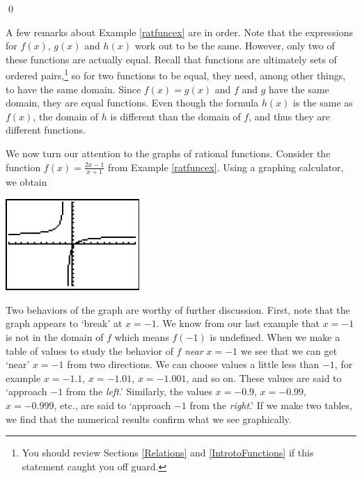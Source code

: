 \vspace{-.35in} \qed

\medskip

A few remarks about Example \ref{ratfuncex} are in order. Note that the expressions for $f(x)$, $g(x)$ and $h(x)$ work out to be the same.  However, only two of these functions are actually equal.  Recall that functions are ultimately sets of ordered pairs,\footnote{You should review Sections \ref{Relations} and \ref{IntrotoFunctions} if this statement caught you off guard.} so for two functions to be equal, they need, among other things, to have the same domain.  Since $f(x) = g(x)$ and $f$ and $g$ have the same domain, they are equal functions.  Even though the formula $h(x)$ is the same as $f(x)$, the domain of $h$ is different than the domain of $f$, and thus they are different functions.  

\medskip

We now turn our attention to the graphs of rational functions. Consider the function $f(x) = \frac{2x-1}{x+1}$ from Example \ref{ratfuncex}.  Using a graphing calculator, we obtain

\medskip

\centerline{\includegraphics[width=2in]{./RationalsGraphics/Rationals01.jpg}}

\medskip

Two behaviors of the graph are worthy of further discussion.  First, note that the graph appears to `break' at $x=-1$. We know from our last example that $x=-1$ is not in the domain of $f$ which means $f(-1)$ is undefined. When we make a table of values to study the behavior of $f$ \textit{near} $x=-1$ we see that we can get `near' $x=-1$ from two directions.  We can choose values a little less than $-1$, for example $x=-1.1$, $x=-1.01$, $x=-1.001$, and so on.  These values are said to `approach $-1$ from the \textit{left}.'  Similarly, the values $x=-0.9$, $x=-0.99$, $x=-0.999$, etc., are said to `approach $-1$ from the \textit{right}.'  If we make two tables, we find that the numerical results confirm what we see graphically.

